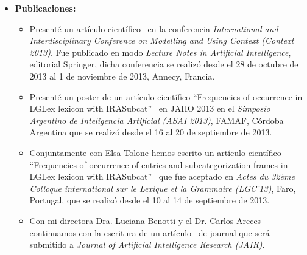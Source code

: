 \begin{itemize}
\begin{itemize}
\item Present\'e un art\'iculo cient\'ifico~\cite{benotti-altamirano-context2013} en la conferencia \emph{International and Interdisciplinary Conference on Modelling and Using Context (Context 2013)}. Fue publicado en modo \emph{lecture notes in Artificial Intelligence}, editorial Springer, dicha conferencia se realiz\'o desde el 28 de octubre de 2013 al 1 de noviembre de 2013, Annecy, Francia. En la presentaci\'on que realic\'e en CONTEXT 2013 conoci varios investigadores del \'area los cuales se mostraron interesados en mi trabajo Dra. Roberts Craige de Ohio	State	University, Dr. Stone Matthew, Rutgers, USA.
\end{itemize}
\item \textbf{Publicaciones:} 
\begin{itemize}
\item Present\'e un art\'iculo cient\'ifico~\cite{benotti-altamirano-context2013} en la conferencia \emph{International and Interdisciplinary Conference on Modelling and Using Context (Context 2013)}. Fue publicado en modo \emph{Lecture Notes in Artificial Intelligence}, editorial Springer, dicha conferencia se realiz\'o desde el 28 de octubre de 2013 al 1 de noviembre de 2013, Annecy, Francia.
\item Present\'e un poster de un art\'iculo cient\'ifico ``Frequencies of occurrence in LGLex lexicon with IRASubcat''~\cite{tolone-altamirano} en JAIIO 2013 en el \emph{Simposio Argentino de Inteligencia Artificial (ASAI 2013)}, FAMAF, C\'ordoba Argentina que se realiz\'o desde el 16 al 20 de septiembre de 2013.
\item Conjuntamente con Elsa Tolone hemos escrito un art\'iculo cient\'ifico ``Frequencies of occurrence of entries and subcategorization frames in LGLex lexicon with IRASubcat''~\cite{tolone-altamirano-2} que fue aceptado en \emph{Actes du 32\`eme Colloque international sur le Lexique et la Grammaire (LGC'13)}, Faro, Portugal, que se realiz\'o desde el 10 al 14 de septiembre de 2013.
\item Con mi directora Dra. Luciana Benotti y el Dr. Carlos Areces continuamos con la escritura de un art\'iculo~\cite{benotti-altamirano-jair} de journal que ser\'a submitido a \emph{Journal of Artificial Intelligence Research (JAIR)}.
\end{itemize}


\end{itemize}
